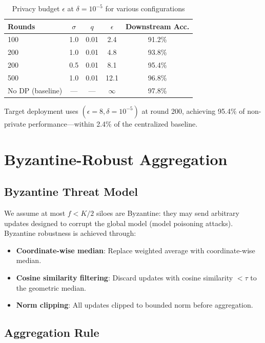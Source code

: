 \documentclass[11pt,a4paper]{article}
\begin{document}
\begin{table}[H]
\centering
\caption{Privacy budget $\epsilon$ at $\delta = 10^{-5}$ for various configurations}
\label{tab:privacy_budget}
\begin{tabular}{lcccc}
\toprule
Rounds & $\sigma$ & $q$ & $\epsilon$ & Downstream Acc. \\
\midrule
100 & 1.0 & 0.01 & 2.4 & 91.2\% \\
200 & 1.0 & 0.01 & 4.8 & 93.8\% \\
200 & 0.5 & 0.01 & 8.1 & 95.4\% \\
500 & 1.0 & 0.01 & 12.1 & 96.8\% \\
No DP (baseline) & — & — & $\infty$ & 97.8\% \\
\bottomrule
\end{tabular}
\end{table}

Target deployment uses $(\epsilon=8, \delta=10^{-5})$ at round 200, achieving 95.4\% of non-private performance—within 2.4\% of the centralized baseline.

\section{Byzantine-Robust Aggregation}
\label{sec:byzantine}

\subsection{Byzantine Threat Model}

We assume at most $f < K/2$ siloes are Byzantine: they may send arbitrary updates designed to corrupt the global model (model poisoning attacks). Byzantine robustness is achieved through:

\begin{itemize}
  \item \textbf{Coordinate-wise median}: Replace weighted average with coordinate-wise median.
  \item \textbf{Cosine similarity filtering}: Discard updates with cosine similarity $< \tau$ to the geometric median.
  \item \textbf{Norm clipping}: All updates clipped to bounded norm before aggregation.
\end{itemize}

\subsection{Aggregation Rule}
\end{document}
